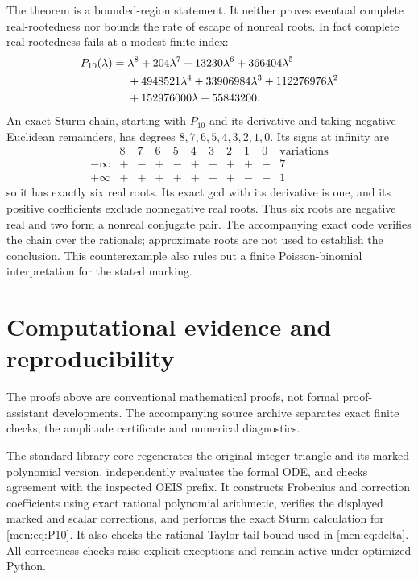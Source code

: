 \documentclass[11pt,letterpaper]{article}
\theoremstyle{remark}\newtheorem{remark}[theorem]{Remark}
\begin{document}
The theorem is a bounded-region statement. It neither proves eventual complete real-rootedness nor bounds the rate of escape of nonreal roots. In fact complete real-rootedness fails at a modest finite index:
\begin{align}\label{men:eq:P10}
 P_{10}(\lambda)={}&\lambda^8+204\lambda^7+13230\lambda^6+366404\lambda^5\notag\\
 &+4948521\lambda^4+33906984\lambda^3+112276976\lambda^2\notag\\
 &+152976000\lambda+55843200.
\end{align}
An exact Sturm chain, starting with $P_{10}$ and its derivative and taking negative Euclidean remainders, has degrees $8,7,6,5,4,3,2,1,0$. Its signs at infinity are
\[
\begin{array}{c|rrrrrrrrr|c}
 &8&7&6&5&4&3&2&1&0&\text{variations}\\\hline
 -\infty&+&-&+&-&+&-&+&+&-&7\\
 +\infty&+&+&+&+&+&+&+&-&-&1
\end{array}
\]
so it has exactly six real roots. Its exact gcd with its derivative is one, and its positive coefficients exclude nonnegative real roots. Thus six roots are negative real and two form a nonreal conjugate pair. The accompanying exact code verifies the chain over the rationals; approximate roots are not used to establish the conclusion. This counterexample also rules out a finite Poisson-binomial interpretation for the stated marking.

\section{Computational evidence and reproducibility}\label{men:sec:reproduce}
The proofs above are conventional mathematical proofs, not formal proof-assistant developments. The accompanying source archive separates exact finite checks, the amplitude certificate and numerical diagnostics.

The standard-library core regenerates the original integer triangle and its marked polynomial version, independently evaluates the formal ODE, and checks agreement with the inspected OEIS prefix. It constructs Frobenius and correction coefficients using exact rational polynomial arithmetic, verifies the displayed marked and scalar corrections, and performs the exact Sturm calculation for \eqref{men:eq:P10}. It also checks the rational Taylor-tail bound used in \eqref{men:eq:delta}. All correctness checks raise explicit exceptions and remain active under optimized Python.
\end{document}
